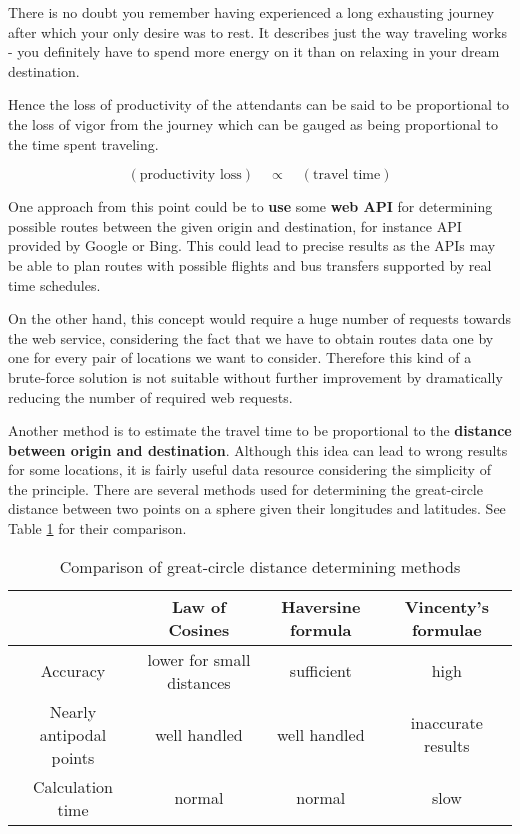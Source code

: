 There is no doubt you remember having experienced a long exhausting journey after which your only desire was to rest. It describes just the way traveling works - you definitely have to spend more energy on it than on relaxing in your dream destination.

Hence the loss of productivity of the attendants can be said to be proportional to the loss of vigor from the journey which can be gauged as being proportional to the time spent traveling.

$$(\text{productivity loss})\quad \propto\quad (\text{travel time})$$

One approach from this point could be to \textbf{use} some \textbf{web API} for determining possible routes between the given origin and destination, for instance API provided by Google or Bing. This could lead to precise results as the APIs may be able to plan routes with possible flights and bus transfers supported by real time schedules.

On the other hand, this concept would require a huge number of requests towards the web service, considering the fact that we have to obtain routes data one by one for every pair of locations we want to consider. Therefore this kind of a brute-force solution is not suitable without further improvement by dramatically reducing the number of required web requests.

Another method is to estimate the travel time to be proportional to the \textbf{distance between origin and destination}. Although this idea can lead to wrong results for some locations, it is fairly useful data resource considering the simplicity of the principle. There are several methods used for determining the great-circle distance between two points on a sphere given their longitudes and latitudes. See Table \ref{table:distance-methods} for their comparison.

\begin{table}[!ht]
\centering \centering
\begin{tabular}{|c|c|c|c|}
\cline{2-4}
\multicolumn{1}{c|}{} & \textbf{Law of Cosines} & \textbf{Haversine formula} & \textbf{Vincenty's formulae} \\
\hline
Accuracy & lower for small distances & sufficient & high \\
\hline
Nearly antipodal points & well handled & well handled & inaccurate results \\
\hline
Calculation time & normal & normal & slow \\
\hline
\end{tabular}
\caption{Comparison of great-circle distance determining methods}
\label{table:distance-methods}
\end{table}

